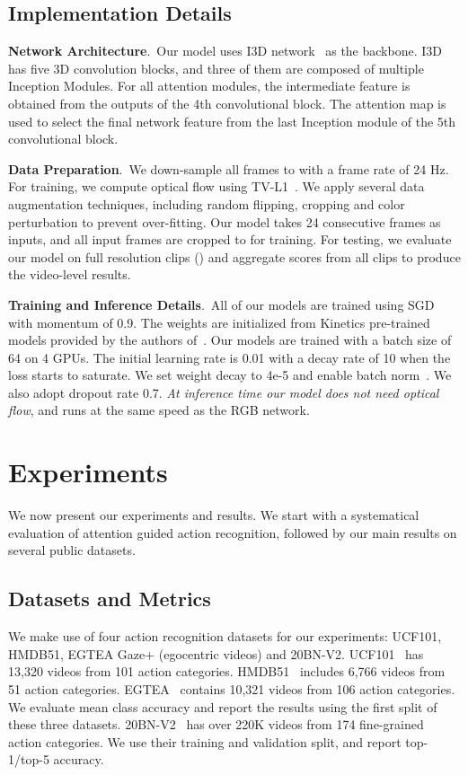 \documentclass{bmvc2k}
\begin{document}
\subsection{Implementation Details}
\noindent \textbf{Network Architecture}.\ 
Our model uses I3D network~\cite{carreira2017quo} as the backbone. I3D has five 3D convolution blocks, and three of them are composed of multiple Inception Modules. For all attention modules, the intermediate feature  is obtained from the outputs of the 4th convolutional block. The attention map is used to select the final network feature from the last Inception module of the 5th convolutional block.

\noindent \textbf{Data Preparation}.\
We down-sample all frames to  with a frame rate of 24 Hz. For training, we compute optical flow using TV-L1~\cite{perez2013tv}. We apply several data augmentation techniques, including random flipping, cropping and color perturbation to prevent over-fitting. Our model takes 24 consecutive frames as inputs, and all input frames are cropped to  for training. For testing, we evaluate our model on full resolution clips () and aggregate scores from all clips to produce the video-level results.

\noindent \textbf{Training and Inference Details}.\
All of our models are trained using SGD with momentum of 0.9. The weights are initialized from Kinetics pre-trained models provided by the authors of~\cite{carreira2017quo}. Our models are trained with a batch size of 64 on 4 GPUs. The initial learning rate is 0.01 with a decay rate of 10 when the loss starts to saturate. We set weight decay to 4e-5 and enable batch norm~\cite{ioffe2009batch}. We also adopt dropout rate 0.7. {\it At inference time our model does not need optical flow}, and runs at the same speed as the RGB network. 

\section{Experiments}
\label{sec:exp}
We now present our experiments and results. We start with a systematical evaluation of attention guided action recognition, followed by our main results on several public datasets. 

\subsection{Datasets and Metrics}
We make use of four action recognition datasets for our experiments: UCF101, HMDB51, EGTEA Gaze+ (egocentric videos) and 20BN-V2. UCF101~\cite{Soomro2012UCF101AD} has 13,320 videos from 101 action categories. HMDB51~\cite{kuehne2011hmdb} includes 6,766 videos from 51 action categories. EGTEA~\cite{Li_2018_ECCV,li2020eye} contains 10,321 videos from 106 action categories. We evaluate mean class accuracy and report the results using the first split of these three datasets. 20BN-V2~\cite{mahdisoltani2018fine} has over 220K videos from 174 fine-grained action categories. We use their training and validation split, and report top-1/top-5 accuracy.
\end{document}
